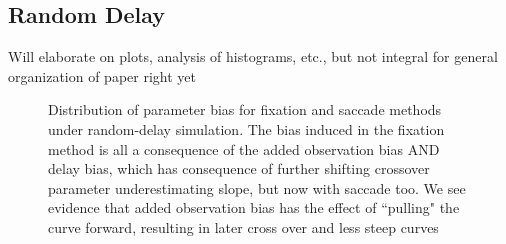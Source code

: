 \documentclass{article}
\begin{document}
\subsection{Random Delay}


Will elaborate on plots, analysis of histograms, etc., but not integral for general organization of paper right yet


\begin{figure}[H]
    \centering
\caption{Distribution of parameter bias for fixation and saccade methods under random-delay simulation. The bias induced in the fixation method is all a consequence of the added observation bias AND delay bias, which has consequence of further shifting crossover parameter underestimating slope, but now with saccade too. We see evidence that added observation bias has the effect of ``pulling" the curve forward, resulting in later cross over and less steep curves}
\label{fig:random_par_bias}
\end{figure}
\end{document}
